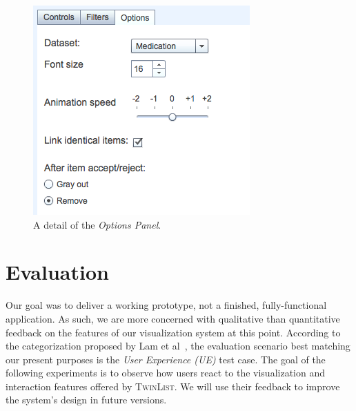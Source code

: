 \documentclass{chi2009}
\newcommand{\TwinList}{\textsc{TwinList}}
\newcommand{\Options}{\textit{Options Panel}}
\begin{document}
\begin{figure}[t]
\begin{center}
\includegraphics[width=1\linewidth]{img/options.png}
\end{center}
   \caption{A detail of the \Options.}
   \label{fig:options}
\end{figure}

\section{Evaluation}
Our goal was to deliver a working prototype, not a finished, fully-functional application. As such, we are more concerned with qualitative than quantitative feedback on the features of our visualization system at this point. According to the categorization proposed by Lam et al~\cite{lam-bertini-isenberg-plaisant-carpendale-2011}, the evaluation scenario best matching our present purposes is the \textit{User Experience (UE)} test case. The goal of the following experiments is to observe how users react to the visualization and interaction features offered by \TwinList. We will use their feedback to improve the system's design in future versions.
\end{document}
